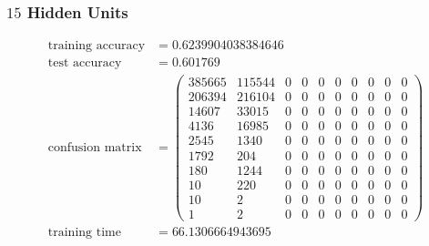 \documentclass[11pt]{article}
\begin{document}
\subsubsection{$15$ Hidden Units}
\begin{equation}
  \begin{split}
    \text{training accuracy} &= 0.6239904038384646\\
    \text{test accuracy} &= 0.601769\\
    \text{confusion matrix} &=
    \begin{pmatrix}
      385665 & 115544 & 0 & 0 & 0 & 0 & 0 & 0 & 0 & 0 \\
      206394 & 216104 & 0 & 0 & 0 & 0 & 0 & 0 & 0 & 0 \\
      14607  & 33015  & 0 & 0 & 0 & 0 & 0 & 0 & 0 & 0 \\
      4136   & 16985  & 0 & 0 & 0 & 0 & 0 & 0 & 0 & 0 \\
      2545   & 1340   & 0 & 0 & 0 & 0 & 0 & 0 & 0 & 0 \\
      1792   & 204    & 0 & 0 & 0 & 0 & 0 & 0 & 0 & 0 \\
      180    & 1244   & 0 & 0 & 0 & 0 & 0 & 0 & 0 & 0 \\
      10     & 220    & 0 & 0 & 0 & 0 & 0 & 0 & 0 & 0 \\
      10     & 2      & 0 & 0 & 0 & 0 & 0 & 0 & 0 & 0 \\
      1      & 2      & 0 & 0 & 0 & 0 & 0 & 0 & 0 & 0
    \end{pmatrix}\\
    \text{training time} &= 66.1306664943695
  \end{split}
\end{equation}
\end{document}
